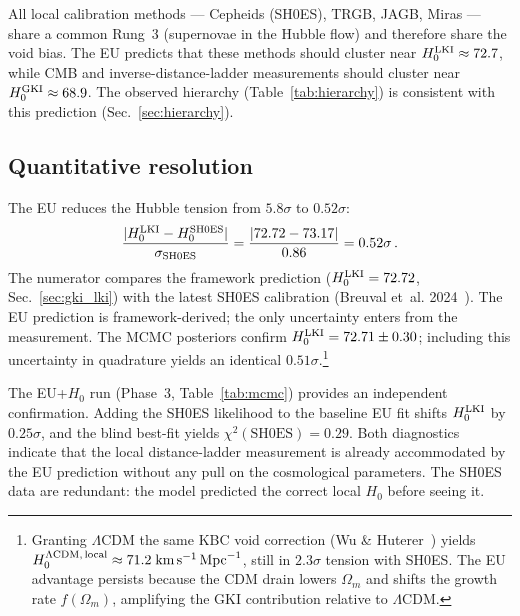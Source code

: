 \documentclass[a4paper,fleqn]{cas-dc}
\begin{document}
All local calibration methods --- Cepheids (SH0ES),
TRGB, JAGB, Miras --- share a common Rung~3
(supernovae in the Hubble flow) and therefore share
the void bias. The EU predicts that these methods
should cluster near $H_0^{\rm LKI} \approx 72.7$,
while CMB and inverse-distance-ladder measurements
should cluster near $H_0^{\rm GKI} \approx 68.9$. The
observed hierarchy (Table~\ref{tab:hierarchy}) is
consistent with this prediction
(Sec.~\ref{sec:hierarchy}).

\subsection{Quantitative resolution}
\label{sec:quantitative_h0}

The EU reduces the Hubble tension from $5.8\sigma$
to $0.52\sigma$:
\begin{equation}
\frac{|H_0^{\rm LKI} - H_0^{\rm SH0ES}|}
     {\sigma_{\rm SH0ES}}
= \frac{|72.72 - 73.17|}{0.86}
= 0.52\sigma\,.
\label{eq:h0_tension}
\end{equation}
The numerator compares the framework prediction
($H_0^{\rm LKI} = 72.72$, Sec.~\ref{sec:gki_lki})
with the latest SH0ES calibration (Breuval et~al.
2024~\cite{breuval2024}). The EU prediction is
framework-derived; the only uncertainty enters from
the measurement. The MCMC posteriors confirm
$H_0^{\rm LKI} = 72.71 \pm 0.30$; including this
uncertainty in quadrature yields an identical
$0.51\sigma$.\footnote{Granting
$\Lambda$CDM the same KBC void correction
(Wu \& Huterer~\cite{wu_huterer2017}) yields
$H_0^{\Lambda{\rm CDM},\,{\rm local}} \approx 71.2\;\text{km}\,\text{s}^{-1}\,\text{Mpc}^{-1}$,
still in $2.3\sigma$ tension with SH0ES.
The EU advantage persists because the CDM drain
lowers $\Omega_m$ and shifts the growth rate
$f(\Omega_m)$, amplifying the GKI contribution
relative to $\Lambda$CDM.}

The EU+$H_0$ run (Phase~3, Table~\ref{tab:mcmc}) provides an independent
confirmation. Adding the SH0ES likelihood to the
baseline EU fit shifts $H_0^{\rm LKI}$ by
$0.25\sigma$, and the blind best-fit yields
$\chi^2(\text{SH0ES}) = 0.29$.
Both diagnostics indicate that the local
distance-ladder measurement is already accommodated
by the EU prediction without any pull on the
cosmological parameters. The SH0ES data are
redundant: the model predicted the correct local
$H_0$ before seeing it.
\end{document}
